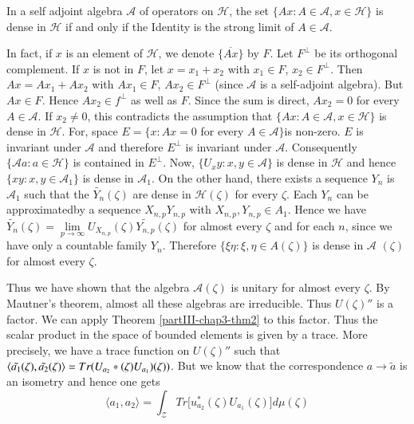 \setcounter{lem}{0}
\begin{lem}\label{partIII-chap3-lem1}%
 In a self adjoint algebra $\mathcal{A}$ of operators on $\mathscr{H}$,
 the set $\{ Ax: A \in \mathcal{A}, x \in \mathscr{H}\}$  is dense in
 $\mathscr{H}$ if and only if the Identity is the strong limit of $A
 \in \mathcal{A}$. 
 \end{lem}

In fact, if $x$ is an element of $\mathscr{H}$, we denote
$\overline{\{Ax\}}$ by $F$. Let $F^\perp$ be its orthogonal complement. If
$x$ is not in $F$, let $x = x_1 + x_2$ with $x_1 \in F$, $x_2 \in
F^\perp$. Then $Ax = Ax_1 + Ax_2$ with $Ax_1 \in F$, $Ax_2 \in F^\perp$ 
(since $\mathcal{A}$ is a self-adjoint algebra). But $Ax \in F$. Hence
$Ax_2 \in f^{\perp}$ as well as $F$. Since the sum is direct, $Ax_2=0 $
for every $A \in \mathcal{A}$. If $x_2 \neq 0$, this contradicts the
assumption that $\{Ax: A \in \mathcal{A}, x\in\mathscr{H}\}$ is dense
in $\mathscr{H}$. For, space $E = \{ x : A x = 0 $ for every
$A \in \mathcal{A} \} $is non-zero. $E$ is invariant under $\mathcal
{A}$ and therefore $E^\perp$  is invariant under
$\mathcal{A}$. Consequently $\{ \mathcal {A} a : a \in \mathcal {H}\}$
is  contained in $E^ \perp$.  Now, $\{U _{x}y : x, y \in \mathcal {A}
\}$ is dense in $\mathcal {H}$ and hence  $\{ x y : x, y \in
\mathcal{A_1} \}$   is dense in $\mathcal{A}_1$. On the other hand,
there  exists a sequence ${Y_n}$ is $\mathcal{A}_1$ such that the
  $\tilde{Y_n} (\zeta)$  are dense in $\mathcal {H} (\zeta)$ for every
  $\zeta$. Each ${Y_n}$ can be  approximated\pageoriginale by a sequence
  $X_{n,p}Y_{n,p}$ with $X_{n,p}, Y_{n,p} \in A_{1}$.  Hence we have
  $\tilde{Y_n} (\zeta) = \underset{p \rightarrow \infty}{\lim}
  U_{X_{n,p}} (\zeta) \tilde{Y_{n,p}} (\zeta)$ for almost every $\zeta$
  and for each $n$, since we have only a countable family
  $Y_n$. Therefore $ \{ \xi \eta : \xi, \eta \in A(\zeta) \}$ is dense
  in $\mathcal{A}$ $(\zeta)$ for almost every $\zeta$. 

Thus we have shown that the algebra $\mathcal{A} (\zeta)$ is unitary
for  almost every $\zeta$. By Mautner's theorem, almost all these
algebras are irreducible. Thus $U(\zeta)''$ is a factor. We can apply
Theorem \ref{partIII-chap3-thm2} 
to this factor. Thus the scalar product in the space of
bounded elements is given by a trace. More precisely, we have a trace
function on $U (\zeta)''$ such that $\langle \tilde{a_1} (\zeta),\break
\tilde{a_2}(\zeta) \rangle = Tr(U_{a_2}* (\zeta) U_{a_{1}})
(\zeta))$. But we know  that the correspondence $a \rightarrow
\tilde{a}$ is an isometry and hence one gets  
$$ 
\langle a_{1}, a_{2} \rangle = \int_{\mathcal{Z}} Tr\bigg[ u_{a_{2}}^* (\zeta)
  U_{a_{1}} (\zeta) \bigg] d \mu (\zeta) 
$$

